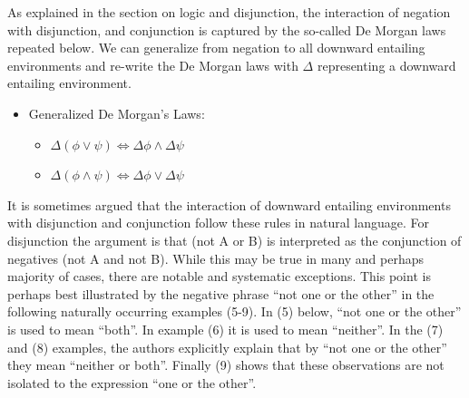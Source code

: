 \documentclass[oneside]{report}
\theoremstyle{definition}
\theoremstyle{definition}
\theoremstyle{definition}
\theoremstyle{remark}
\begin{document}
As explained in the section on logic and disjunction, the interaction of
negation with disjunction, and conjunction is captured by the so-called
De Morgan laws repeated below. We can generalize from negation to all
downward entailing environments and re-write the De Morgan laws with
\(\Delta\) representing a downward entailing environment.
\begin{itemize}
\tightlist
\item
  Generalized De Morgan's Laws:
  \begin{itemize}
  \tightlist
  \item
    \(\Delta (\phi \lor \psi) \Leftrightarrow \Delta \phi \land \Delta \psi\)
  \item
    \(\Delta (\phi \land \psi) \Leftrightarrow \Delta \phi \lor \Delta \psi\)
  \end{itemize}
\end{itemize}
It is sometimes argued that the interaction of downward entailing
environments with disjunction and conjunction follow these rules in
natural language. For disjunction the argument is that (not A or B) is
interpreted as the conjunction of negatives (not A and not B). While
this may be true in many and perhaps majority of cases, there are
notable and systematic exceptions. This point is perhaps best
illustrated by the negative phrase ``not one or the other'' in the
following naturally occurring examples (5-9). In (5) below, ``not one or
the other'' is used to mean ``both''. In example (6) it is used to mean
``neither''. In the (7) and (8) examples, the authors explicitly explain
that by ``not one or the other'' they mean ``neither or both''. Finally
(9) shows that these observations are not isolated to the expression
``one or the other''.
\end{document}
